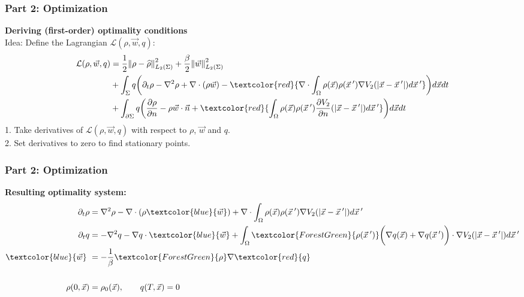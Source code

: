 \documentclass[aspectratio=169,xcolor=dvipsnames]{beamer}
\begin{document}
\begin{frame}
\frametitle{Part 2: Optimization}
\textbf{Deriving (first-order) optimality conditions}\\
Idea: Define the Lagrangian $\mathcal{L}(\rho, \vec{w}, q)$:
\begin{align*}
\mathcal{L}(\rho, \vec{w},q)&= \frac{1}{2}\norm{\rho- \widehat{\rho}}_{L_2(\Sigma)}^2 + \frac{\beta}{2} \norm{\vec{w}}_{L_2(\Sigma)}^2\\
&+ \int_\Sigma q \bigg( \partial_t \rho - \nabla^2 \rho + \nabla \cdot (\rho \vec{w})
-\textcolor{red}{ \nabla \cdot\int_\Omega \rho(\vec{x}) \rho(\vec{x}\hspace{0.2em}') \nabla V_2(|\vec{x}-\vec{x}\hspace{0.2em}'|)d\vec{x}\hspace{0.2em}'}    \bigg) d\vec{x} dt\\
&+ \int_{\partial \Sigma} q \bigg(\frac{\partial \rho}{\partial n} - \rho \vec{w} \cdot \vec{n} +\textcolor{red}{ \int_\Omega \rho(\vec{x}) \rho(\vec{x}\hspace{0.2em}')  \frac{ \partial  V_2}{\partial n}(|\vec{x}-\vec{x}\hspace{0.2em}'|)d\vec{x}\hspace{0.2em}'} \bigg) d\vec{x} dt\\
\end{align*}
1. Take derivatives of $\mathcal{L}(\rho, \vec{w}, q)$ with respect to $\rho$, $\vec{w}$ and $q$. \\
2. Set derivatives to zero to find stationary points. \\
\end{frame}
\begin{frame}
	\frametitle{Part 2: Optimization}
	\textbf{Resulting optimality system:}\\
     
	\begin{align*}
	 \partial_t \rho &= \nabla^2 \rho - \nabla \cdot (\rho \textcolor{blue}{\vec{w}})
	+ \nabla \cdot \int_\Omega \rho(\vec{x}) \rho(\vec{x}\hspace{0.2em}') \nabla V_2(|\vec{x}-\vec{x}\hspace{0.2em}'|)d\vec{x}\hspace{0.2em}'  \\
	\partial_t q &= -\nabla^2 q - \nabla q \cdot \textcolor{blue}{\vec{w}} + \int_\Omega \textcolor{ForestGreen}{\rho(\vec{x}\hspace{0.2em}')} \bigg(\nabla q(\vec{x}) + \nabla q(\vec{x}\hspace{0.2em}')\bigg)\cdot  \nabla V_2(|\vec{x}-\vec{x}\hspace{0.2em}'|)d\vec{x}\hspace{0.2em}' \\
    \textcolor{blue}{\vec{w}} \ &= - \frac{1}{\beta}\textcolor{ForestGreen}{\rho} \nabla  \textcolor{red}{q}\\
    \\
    \rho(0,\vec{x})&=\rho_0(\vec{x}), \qquad q(T,\vec{x})= 0 \\
	\end{align*}
\end{frame}
\end{document}
